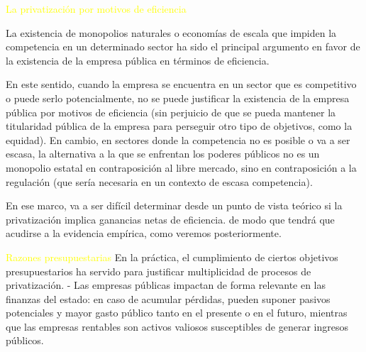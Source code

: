 \documentclass[10pt,a4paper]{article}
\begin{document}
\textcolor{yellow}{La privatización por motivos de eficiencia}

La existencia de monopolios naturales o economías de escala que impiden la competencia en un determinado sector ha sido el principal argumento en favor de la existencia de la empresa pública en términos de eficiencia. 

En este sentido, cuando la empresa se encuentra en un sector que es competitivo o puede serlo potencialmente, no se puede justificar la existencia de la empresa pública por motivos de eficiencia (sin perjuicio de que se pueda mantener la titularidad pública de la empresa para perseguir otro tipo de objetivos, como la equidad). En cambio, en sectores donde la competencia no es posible o va a ser escasa, la alternativa a la que se enfrentan los poderes públicos no es un monopolio estatal en contraposición al libre mercado, sino en contraposición a la regulación (que sería necesaria en un contexto de escasa competencia).

En ese marco, va a ser difícil determinar desde un punto de vista teórico si la privatización implica ganancias netas de eficiencia. de modo que tendrá que acudirse a la evidencia empírica, como veremos posteriormente.


\textcolor{yellow}{Razones presupuestarias}
En la práctica, el cumplimiento de ciertos objetivos presupuestarios ha servido para justificar multiplicidad de procesos de privatización. 
- Las empresas públicas impactan de forma relevante en las finanzas del estado: en caso de acumular pérdidas, pueden suponer pasivos potenciales y mayor gasto público tanto en el presente o en el futuro, mientras que las empresas rentables son activos valiosos susceptibles de generar ingresos públicos.
\end{document}
